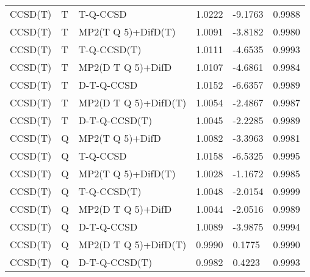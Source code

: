 \begin{table}
\begin{tabular}{l l l l l l }
    CCSD(T) & T & T-Q-CCSD & 1.0222 & -9.1763 & 0.9988 \\ 
    CCSD(T) & T & MP2(T Q 5)+DifD(T) & 1.0091 & -3.8182 & 0.9980 \\ 
    CCSD(T) & T & T-Q-CCSD(T) & 1.0111 & -4.6535 & 0.9993 \\ 
    CCSD(T) & T & MP2(D T Q 5)+DifD & 1.0107 & -4.6861 & 0.9984 \\ 
    CCSD(T) & T & D-T-Q-CCSD & 1.0152 & -6.6357 & 0.9989 \\ 
    CCSD(T) & T & MP2(D T Q 5)+DifD(T) & 1.0054 & -2.4867 & 0.9987 \\ 
    CCSD(T) & T & D-T-Q-CCSD(T) & 1.0045 & -2.2285 & 0.9989 \\ 
    CCSD(T) & Q & MP2(T Q 5)+DifD & 1.0082 & -3.3963 & 0.9981 \\ 
    CCSD(T) & Q & T-Q-CCSD & 1.0158 & -6.5325 & 0.9995 \\ 
    CCSD(T) & Q & MP2(T Q 5)+DifD(T) & 1.0028 & -1.1672 & 0.9985 \\ 
    CCSD(T) & Q & T-Q-CCSD(T) & 1.0048 & -2.0154 & 0.9999 \\ 
    CCSD(T) & Q & MP2(D T Q 5)+DifD & 1.0044 & -2.0516 & 0.9989 \\ 
    CCSD(T) & Q & D-T-Q-CCSD & 1.0089 & -3.9875 & 0.9994 \\ 
    CCSD(T) & Q & MP2(D T Q 5)+DifD(T) & 0.9990 & 0.1775 & 0.9990 \\ 
    CCSD(T) & Q & D-T-Q-CCSD(T) & 0.9982 & 0.4223 & 0.9993 \\ 
    \hline
  \end{tabular}
\end{table}
